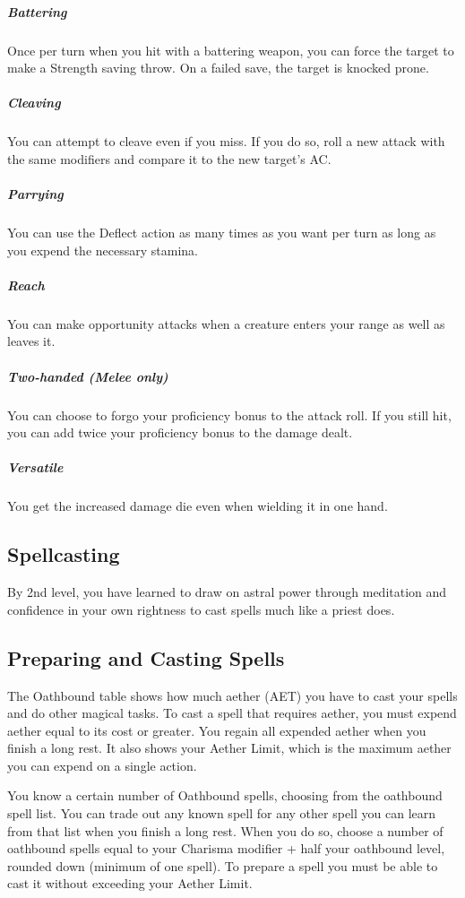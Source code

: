 \subparagraph*{Battering} Once per turn when you hit with a battering weapon, you can force the target to make a Strength saving throw. On a failed save, the target is knocked prone.

\subparagraph*{Cleaving} You can attempt to cleave even if you miss. If you do so, roll a new attack with the same modifiers and compare it to the new target's AC.

\subparagraph*{Parrying} You can use the Deflect action as many times as you want per turn as long as you expend the necessary stamina.

\subparagraph*{Reach} You can make opportunity attacks when a creature enters your range as well as leaves it.

\subparagraph*{Two-handed (Melee only)} You can choose to forgo your proficiency bonus to the attack roll. If you still hit, you can add twice your proficiency bonus to the damage dealt.

\subparagraph*{Versatile} You get the increased damage die even when wielding it in one hand.

\subsection{Spellcasting}

By 2nd level, you have learned to draw on astral power through meditation and confidence in your own rightness to cast spells much like a priest does.

\subsection{Preparing and Casting Spells}

The Oathbound table shows how much aether (AET) you have to cast your spells and do other magical tasks. To cast a spell that requires aether, you must expend aether equal to its cost or greater. You regain all expended aether when you finish a long rest. It also shows your Aether Limit, which is the maximum aether you can expend on a single action.

You know a certain number of Oathbound spells, choosing from the oathbound spell list. You can trade out any known spell for any other spell you can learn from that list when you finish a long rest. When you do so, choose a number of oathbound spells equal to your Charisma modifier + half your oathbound level, rounded down (minimum of one spell). To prepare a spell you must be able to cast it without exceeding your Aether Limit.

